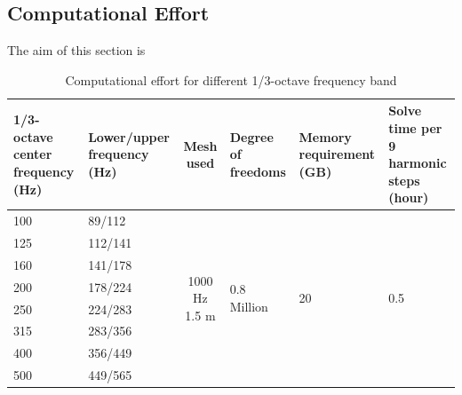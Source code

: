 \subsection*{Computational Effort}
The aim of this section is 

\begin{table}[H]
	\caption{Computational effort for different 1/3-octave frequency band}
	\begin{tabularx}{\textwidth}{|X|X|c|X|X|X|}
		\hline
		1/3-octave center frequency (Hz) & Lower/upper frequency (Hz) & Mesh used                       & Degree of freedoms            & Memory requirement (GB) & Solve time per 9 harmonic steps (hour) \\ \hline
		100                              & 89/112                     & \multirow{10}{*}{1000 Hz 1.5 m} & \multirow{10}{*}{0.8 Million} & \multirow{10}{*}{20}    & \multirow{10}{*}{0.5}                  \\ \cline{1-2}
		125                              & 112/141                    &                                 &                               &                         &                                        \\ \cline{1-2}
		160                              & 141/178                    &                                 &                               &                         &                                        \\ \cline{1-2}
		200                              & 178/224                    &                                 &                               &                         &                                        \\ \cline{1-2}
		250                              & 224/283                    &                                 &                               &                         &                                        \\ \cline{1-2}
		315                              & 283/356                    &                                 &                               &                         &                                        \\ \cline{1-2}
		400                              & 356/449                    &                                 &                               &                         &                                        \\ \cline{1-2}
		500                              & 449/565                    &                                 &                               &                         &                                        \\ \cline{1-2}

\end{tabularx}
\end{table}

